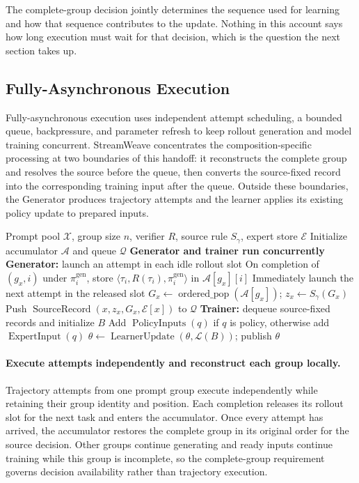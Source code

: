 \documentclass[letterpaper]{article}
\begin{document}
The complete-group decision jointly determines the sequence used for learning and how that sequence contributes to the update.
Nothing in this account says how long execution must wait for that decision, which is the question the next section takes up.

\subsection{Fully-Asynchronous Execution}
\label{sec:async-execution}

Fully-asynchronous execution uses independent attempt scheduling, a bounded queue, backpressure, and parameter refresh to keep rollout generation and model training concurrent.
StreamWeave concentrates the composition-specific processing at two boundaries of this handoff: it reconstructs the complete group and resolves the source before the queue, then converts the source-fixed record into the corresponding training input after the queue.
Outside these boundaries, the Generator produces trajectory attempts and the learner applies its existing policy update to prepared inputs.

\begin{algorithm}[t]
\caption{StreamWeave}
\label{alg:streamweave}
\begin{algorithmic}[1]
\REQUIRE Prompt pool $\mathcal{X}$, group size $n$, verifier $R$, source rule $S_\gamma$, expert store $\mathcal{E}$
\STATE Initialize accumulator $\mathcal{A}$ and queue $\mathcal{Q}$
\STATE \textbf{Generator and trainer run concurrently}
\STATE \textbf{Generator:} launch an attempt in each idle rollout slot
\STATE On completion of $(g_x,i)$ under $\pi_i^{\mathrm{gen}}$, store
$\langle\tau_i,R(\tau_i),\pi_i^{\mathrm{gen}}\rangle$ in $\mathcal{A}[g_x][i]$
\STATE Immediately launch the next attempt in the released slot
  \STATE $G_x\leftarrow\operatorname{ordered\_pop}(\mathcal{A}[g_x])$;
  $z_x\leftarrow S_\gamma(G_x)$
  \STATE Push $\operatorname{SourceRecord}(x,z_x,G_x,\mathcal{E}[x])$ to $\mathcal{Q}$
\ENDIF
\STATE \textbf{Trainer:} dequeue source-fixed records and initialize $B$
  \STATE Add $\operatorname{PolicyInputs}(q)$ if $q$ is policy, otherwise add $\operatorname{ExpertInput}(q)$
\ENDFOR
\STATE $\theta\leftarrow\operatorname{LearnerUpdate}(\theta,\mathcal{L}(B))$; publish $\theta$
\end{algorithmic}
\end{algorithm}

\paragraph{Execute attempts independently and reconstruct each group locally.}
Trajectory attempts from one prompt group execute independently while retaining their group identity and position.
Each completion releases its rollout slot for the next task and enters the accumulator.
Once every attempt has arrived, the accumulator restores the complete group in its original order for the source decision.
Other groups continue generating and ready inputs continue training while this group is incomplete, so the complete-group requirement governs decision availability rather than trajectory execution.
\end{document}
